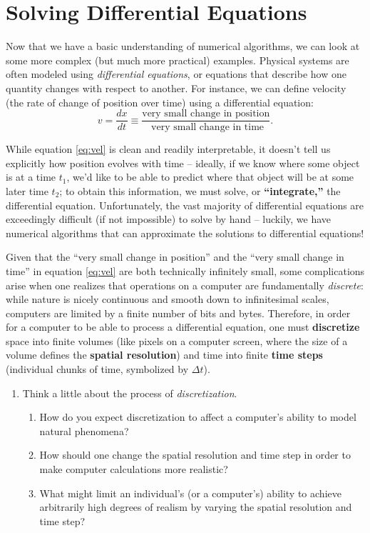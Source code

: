 \documentclass[11pt]{article}
\begin{document}
\section{Solving Differential Equations}
Now that we have a basic understanding of numerical algorithms, we can look at some more complex (but much more practical) examples. Physical systems are often modeled using \textit{differential equations}, or equations that describe how one quantity changes with respect to another. For instance, we can define velocity (the rate of change of position over time) using a differential equation:
\begin{equation} \label{eq:vel}
    v = \frac{dx}{dt} \equiv \frac{\text{very small change in position}}{\text{ very small change in time}}.
\end{equation}

\noindent
While equation \ref{eq:vel} is clean and readily interpretable, it doesn't tell us explicitly how position evolves with time -- ideally, if we know where some object is at a time $t_1$, we'd like to be able to predict where that object will be at some later time $t_2$; to obtain this information, we must solve, or \textbf{``integrate,''} the differential equation. Unfortunately, the vast majority of differential equations are exceedingly difficult (if not impossible) to solve by hand -- luckily, we have numerical algorithms that can approximate the solutions to differential equations!

\medskip \noindent
Given that the ``very small change in position'' and the ``very small change in time'' in equation \ref{eq:vel} are both technically infinitely small, some complications arise when one realizes that operations on a computer are fundamentally \textit{discrete}: while nature is nicely continuous and smooth down to infinitesimal scales, computers are limited by a finite number of bits and bytes. Therefore, in order for a computer to be able to process a differential equation, one must \textbf{discretize} space into finite volumes (like pixels on a computer screen, where the size of a volume defines the \textbf{spatial resolution}) and time into finite \textbf{time steps} (individual chunks of time, symbolized by $\Delta t$).

\begin{enumerate}[resume]
    \item Think a little about the process of \emph{discretization}.
    \begin{enumerate}
        \item How do you expect discretization to affect a computer's ability to model natural phenomena?
        
        \item How should one change the spatial resolution and time step in order to make computer calculations more realistic?
        
        \item What might limit an individual's (or a computer's) ability to achieve arbitrarily high degrees of realism by varying the spatial resolution and time step?
    \end{enumerate}  
\end{enumerate}
\end{document}
